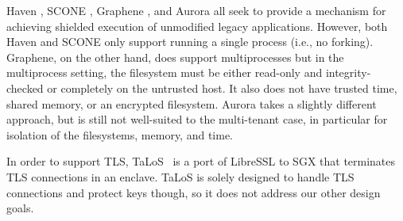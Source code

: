 
Haven \cite{baumann2015shielding}, SCONE \cite{199364}, Graphene
\cite{graphene}, and Aurora \cite{liang2018aurora} all seek to provide a
mechanism for achieving shielded execution of unmodified legacy applications.
However, both Haven and SCONE only support running a single process (i.e., no
forking).  Graphene, on the other hand, does support multiprocesses but in the
multiprocess setting, the filesystem must be either read-only and
integrity-checked or completely on the untrusted host. It also does not have
trusted time, shared memory, or an encrypted filesystem.  Aurora takes a
slightly different approach, but is still not well-suited to the multi-tenant
case, in particular for isolation of the filesystems, memory, and time.

In order to support TLS, TaLoS~\cite{talos} is a port of LibreSSL to SGX that
terminates TLS connections in an enclave.  TaLoS is solely designed to handle
TLS connections and protect keys though, so it does not address our other
design goals.
%
%
%



